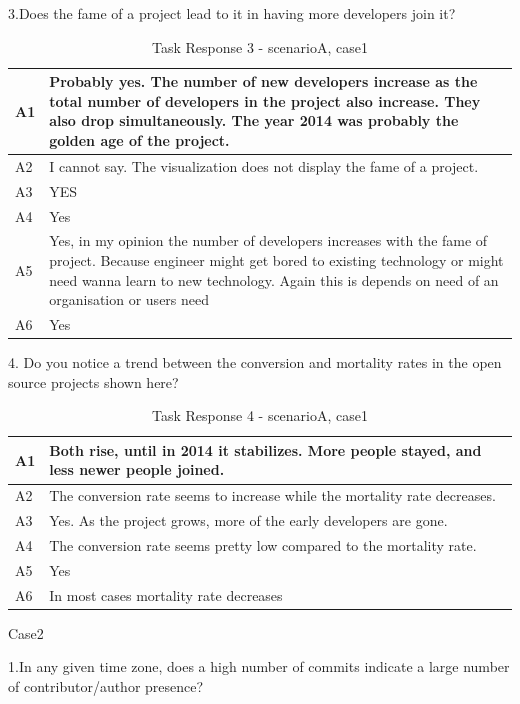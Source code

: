 \documentclass[seploa]{beavtex}
\begin{document}
3.Does the fame of a project lead to it in having more developers join it?

\begin{table}[H]
\begin{tabular}{ |p{2cm}|p{12cm}| }
 \hline
 A1 & Probably yes. The number of new developers increase as the total number of developers in the project also increase. They also drop simultaneously. The year 2014 was probably the golden age of the project.\\
 \hline
 A2 & I cannot say. The visualization does not display the fame of a project.\\ \hline
 A3 & YES\\ \hline
 A4 & Yes\\ \hline
 A5 & Yes, in my opinion the number of developers increases with the fame of project. Because engineer might get bored to existing technology or might need wanna learn to new technology. Again this is depends on need of an organisation or users need\\ \hline
 A6 & Yes\\
 \hline
\end{tabular}
\caption{Task Response 3 - scenarioA, case1}
\label{tab:table3}
\end{table}


4. Do you notice a trend between the conversion and mortality rates in the open source projects shown here?

\begin{table}[H]
\begin{tabular}{ |p{2cm}|p{12cm}| }
 \hline
 A1 & Both rise, until in 2014 it stabilizes. More people stayed, and less newer people joined.\\
 \hline
 A2 & The conversion rate seems to increase while the mortality rate decreases.\\ \hline
 A3 & Yes. As the project grows, more of the early developers are gone.\\ \hline
 A4 & The conversion rate seems pretty low compared to the mortality rate.\\ \hline
 A5 & Yes\\ \hline
 A6 & In most cases mortality rate decreases\\
 \hline
\end{tabular}
\caption{Task Response 4 - scenarioA, case1}
\label{tab:table4}
\end{table}


Case2


1.In any given time zone, does a high number of commits indicate a large number of contributor/author presence?
\end{document}
